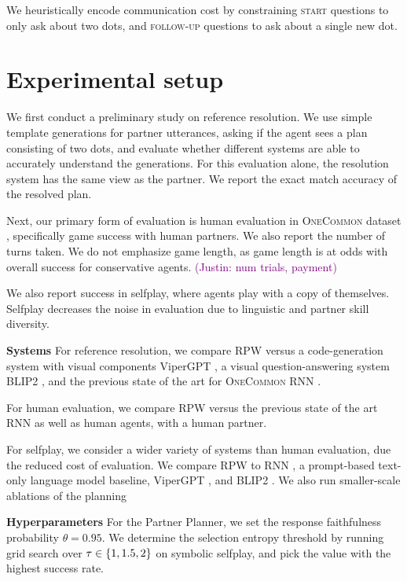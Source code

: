 \documentclass[11pt]{article}
\newcommand{\system}{RPW}
\newcommand{\justin}[1]{{{\textcolor{purple}{(Justin: #1)}}}}
\begin{document}
We heuristically encode communication cost by constraining \textsc{start} questions to only ask about two dots, and \textsc{follow-up} questions
to ask about a single new dot.

\section{Experimental setup}
\label{sec:exp}

We first conduct a preliminary study on reference resolution.
We use simple template generations for partner utterances, asking if the agent sees a plan consisting of two dots,
and evaluate whether different systems are able to accurately understand the generations.
For this evaluation alone, the resolution system has the same view as the partner.
We report the exact match accuracy of the resolved plan.

Next, our primary form of evaluation is
human evaluation in \textsc{OneCommon} dataset \citep{onecommon},
specifically game success with human partners.
We also report the number of turns taken.
We do not emphasize game length, as game length is at odds with overall success
for conservative agents.
\justin{num trials, payment}

We also report success in selfplay, where agents play with a copy of themselves.
Selfplay decreases the noise in evaluation due to linguistic and partner skill diversity.


\textbf{Systems}
For reference resolution, we compare
\system{} versus a code-generation system with visual components ViperGPT \citep{vipergpt},
a visual question-answering system BLIP2 \citep{},
and the previous state of the art for \textsc{OneCommon} RNN \citep{fried}.

For human evaluation, we compare \system{}
versus the previous state of the art RNN \citep{fried} as well as
human agents, with a human partner.

For selfplay, we consider a wider variety of systems than human evaluation, due the reduced cost of evaluation.
We compare \system{} to RNN \citep{fried},
a prompt-based text-only language model baseline,
ViperGPT \citep{vipergpt},
and BLIP2 \citep{}.
We also run smaller-scale ablations of the planning

\textbf{Hyperparameters}
For the Partner Planner, we set the response faithfulness probability $\theta = 0.95$.
We determine the selection entropy threshold by running grid search over $\tau \in \left\{1,1.5,2\right\}$ on symbolic selfplay, and pick the value with the highest success rate.
\end{document}
